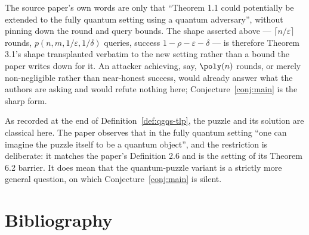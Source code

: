 \documentclass{conjura-conjecture}
\begin{document}
\begin{remark}\label{rem:sharp}
The source paper's own words are only that ``Theorem 1.1 could potentially
be extended to the fully quantum setting using a quantum adversary'',
without pinning down the round and query bounds. The shape asserted above
--- $\lceil n/\varepsilon \rceil$ rounds,
$p(n, m, 1/\varepsilon, 1/\delta)$ queries, success
$1 - \rho - \varepsilon - \delta$ --- is therefore Theorem 3.1's shape
transplanted verbatim to the new setting rather than a bound the paper
writes down for it. An attacker achieving, say, $\poly(n)$ rounds, or
merely non-negligible rather than near-honest success, would already answer
what the authors are asking and would refute nothing here;
Conjecture~\ref{conj:main} is the sharp form.
\end{remark}

\begin{remark}[scope]\label{rem:scope}
As recorded at the end of Definition~\ref{def:qgqs-tlp}, the puzzle and its
solution are classical here. The paper observes that in the fully quantum
setting ``one can imagine the puzzle itself to be a quantum object'', and
the restriction is deliberate: it matches the paper's Definition 2.6 and is
the setting of its Theorem 6.2 barrier. It does mean that the
quantum-puzzle variant is a strictly more general question, on which
Conjecture~\ref{conj:main} is silent.
\end{remark}

\section{Bibliography}
\end{document}
